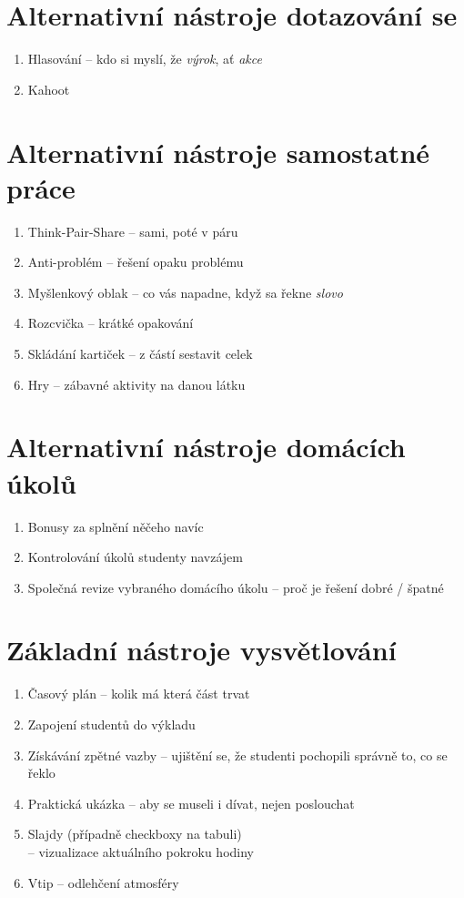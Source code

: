 \documentclass[twoside,openany,10pt]{book}
\begin{document}
\section*{Alternativní nástroje dotazování se}
\begin{enumerate}
\item Hlasování -- kdo si myslí, že \textit{výrok}, ať \textit{akce}
\item Kahoot
\end{enumerate}

\section*{Alternativní nástroje samostatné práce}
\begin{enumerate}
\item Think-Pair-Share -- sami, poté v páru
\item Anti-problém -- řešení opaku problému
\item Myšlenkový oblak -- co vás napadne, když sa řekne \textit{slovo}
\item Rozcvička -- krátké opakování
\item Skládání kartiček -- z částí sestavit celek
\item Hry -- zábavné aktivity na danou látku
\end{enumerate}

\section*{Alternativní nástroje domácích úkolů}
\begin{enumerate}
\item Bonusy za splnění něčeho navíc
\item Kontrolování úkolů studenty navzájem
\item Společná revize vybraného domácího úkolu -- proč je řešení dobré / špatné
\end{enumerate}

\section*{Základní nástroje vysvětlování}
\begin{enumerate}
\item Časový plán -- kolik má která část trvat
\item Zapojení studentů do výkladu
\item Získávání zpětné vazby -- ujištění se, že studenti pochopili správně to, co se řeklo
\item Praktická ukázka -- aby se museli i dívat, nejen poslouchat
\item Slajdy (případně checkboxy na tabuli)\\ -- vizualizace aktuálního pokroku hodiny
\item Vtip -- odlehčení atmosféry
\end{enumerate}
\end{document}
